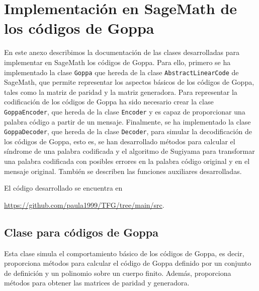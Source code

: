 \chapter[Implementación en SageMath de los códigos de Goppa]{Implementación en SageMath de los códigos de Goppa}
\label{annex:sage-Goppa}

En este anexo describimos la documentación de las clases desarrolladas para implementar en SageMath los códigos de Goppa. Para ello, primero se ha implementado la clase \texttt{Goppa} que hereda de la clase \texttt{AbstractLinearCode} de SageMath, que permite representar los aspectos básicos de los códigos de Goppa, tales como la matriz de paridad y la matriz generadora. Para representar la codificación de los códigos de Goppa ha sido necesario crear la clase \texttt{GoppaEncoder}, que hereda de la clase \texttt{Encoder} y es capaz de proporcionar una palabra código a partir de un mensaje. Finalmente, se ha implementado la clase \texttt{GoppaDecoder}, que hereda de la clase \texttt{Decoder}, para simular la decodificación de los códigos de Goppa, esto es, se han desarrollado métodos para calcular el síndrome de una palabra codificada y el algoritmo de Sugiyama para transformar una palabra codificada con posibles errores en la palabra código original y en el mensaje original. También se describen las funciones auxiliares desarrolladas.

El código desarrollado se encuentra en
\begin{center}
    \url{https://github.com/paula1999/TFG/tree/main/src}.
\end{center}

\section{Clase para códigos de Goppa}

Esta clase simula el comportamiento básico de los códigos de Goppa, es decir, proporciona métodos para calcular el código de Goppa definido por un conjunto de definición y un polinomio sobre un cuerpo finito. Además, proporciona métodos para obtener las matrices de paridad y generadora.

